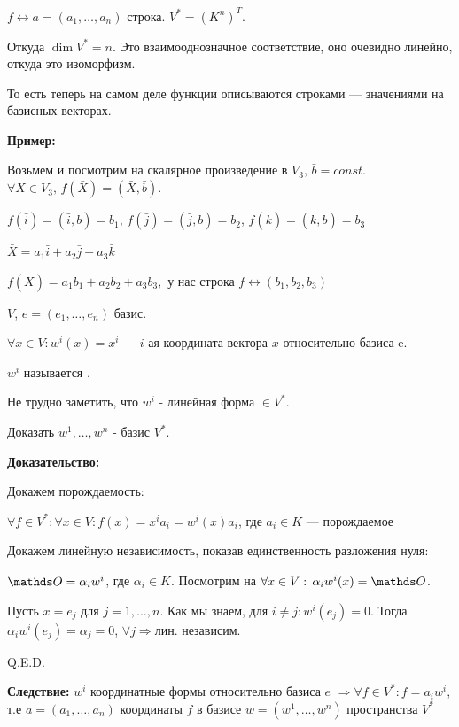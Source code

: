 $f \leftrightarrow a= (a_1,\ldots, a_n)$ строка. %
$V^* = (K^n)^T$. 

Откуда $\dim V^*  = n$. 
Это взаимооднозначное соответствие, оно очевидно линейно, откуда это изоморфизм.

То есть теперь на самом деле функции описываются строками --- значениями на базисных векторах.



\textbf{Пример:} 

 Возьмем и посмотрим на скалярное произведение в
$V_3, \, \bar{b}= const$. $\forall X \in V_3, \, f(\bar{X})=(\bar{X}, \bar{b})$.

$f(\bar{i})=(\bar{i}, \bar{b}) = b_1$, $f(\bar{j})=(\bar{j}, \bar{b}) = b_2$, $f(\bar{k})=(\bar{k}, \bar{b}) = b_3$

$\bar{X}=a_1\bar{i}+a_2\bar{j}+a_3\bar{k}$

$f(\bar{X})=a_1b_1+a_2b_2+a_3b_3, $ у нас строка $f \leftrightarrow (b_1,b_2,b_3)$

 $V$, $e = (e_1,\ldots, e_n)$ базис.

$\forall x \in V: w^i(x) = x^i$ --- $i$-ая координата вектора $x$ относительно базиса e.  

$w^i$ называется .

Не трудно заметить, что $w^i$ - линейная форма $\in V^{*}$.


Доказать $w^1,\ldots,w^n$ - базис $V^*$.

\textbf{Доказательство:}

Докажем порождаемость: 

$\forall f \in V^*: \forall x \in V: f(x) = x^i a_i = w^i(x)a_i$, где $a_i \in K$ --- порождаемое

Докажем линейную независимость, показав единственность разложения нуля:

$\zero = \alpha_i w^i $, где $\alpha_i \in K$. Посмотрим на $\forall x \in V: \, \alpha_iw^i(x)=\zero$.

Пусть $x = e_j$ для $j = 1,\ldots, n$. Как мы знаем, для $i\neq j: w^i(e_j) = 0$. Тогда $\alpha_iw^i(e_j)=\alpha_j =0$,
$\forall j \Rightarrow $лин. независим.

\hfill Q.E.D.

\textbf{Следствие:} $w^i$ координатные формы относительно базиса $e$
$\Rightarrow \forall f \in V^*: f = a_iw^i$, т.е $a=(a_1,\ldots,a_n)$  координаты $f$ в базисе $w = (w^1,\ldots, w^n)$ пространства $V^*$


